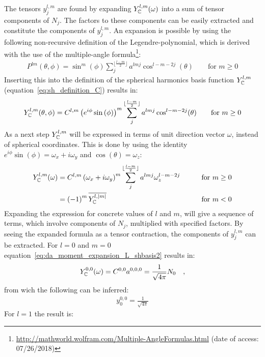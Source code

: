 The tensors $y^{l,m}_j$ are found by expanding $Y_{\mathbb{C}}^{l,m}(\omega)$ into a sum of tensor components of $N_j$. The factors to these components can be easily extracted and constitute the components of $y^{l,m}_j$. An expansion is possible by using the following non-recursive definition of the Legendre-polynomial, which is derived with the use of the multiple-angle formula\footnote{\url{http://mathworld.wolfram.com/Multiple-AngleFormulas.html} (date of access: 07/26/2018)}:
\begin{align}
P^{lm}(\theta, \phi) = \operatorname{sin}^m(\phi)\sum_j^{\lfloor\frac{l-m}{2}\rfloor}a^{lmj}\operatorname{cos}^{l-m-2j}(\theta)
\qquad \text{for } m \ge 0
\end{align}
Inserting this into the definition of the spherical harmonics basis function $Y_{\mathbb{C}}^{l,m}$ (equation~\ref{eq:sh_definition_C}) results in:
\begin{align}
Y_{\mathbb{C}}^{l,m}(\theta, \phi) = C^{l,m}\left(e^{i\phi}\operatorname{sin}\left(\phi\right)\right)^m \sum_j^{\lfloor\frac{l-m}{2}\rfloor}a^{lmj}\operatorname{cos}^{l-m-2j}(\theta)
\qquad \text{for } m \ge 0
\end{align}
As a next step $Y_{\mathbb{C}}^{l,m}$ will be expressed in terms of unit direction vector $\omega$, instead of spherical coordinates. This is done by using the identity $e^{i\phi}\operatorname{sin}\left(\phi\right) = \omega_x + i\omega_y$ and $\operatorname{cos}(\theta) = \omega_z$:
\begin{align}
Y_{\mathbb{C}}^{l,m}(\omega) &=  C^{l,m}\left( \omega_x + i\omega_y\right)^m \sum_j^{\lfloor\frac{l-m}{2}\rfloor}a^{lmj}\omega_z^{l-m-2j}
&\qquad \text{for } m \ge 0
\label{eq:da_moment_expansion_L_shbasis2}
\\
&= \left(-1\right)^m\overline{Y_{\mathbb{C}}^{l,\left\vert m\right\vert}}
&\qquad \text{for } m < 0
\end{align}
Expanding the expression for concrete values of $l$ and $m$, will give a sequence of terms, which involve components of $N_j$, multiplied with specified factors. By seeing the expanded formula as a tensor contraction, the components of $y^{l,m}_j$ can be extracted. For $l=0$ and $m=0$ equation~\ref{eq:da_moment_expansion_L_shbasis2} results in:
\begin{align}
Y_{\mathbb{C}}^{0,0}(\omega) = C^{{0,0}}a^{{0,0,0}} = \frac{1}{\sqrt{4\pi}}N_0\quad,
\end{align}
from wich the following can be inferred:
\begin{align}
y^{0,0}_0 = \frac{1}{\sqrt{4\pi}}
\end{align}
For $l=1$ the result is:
